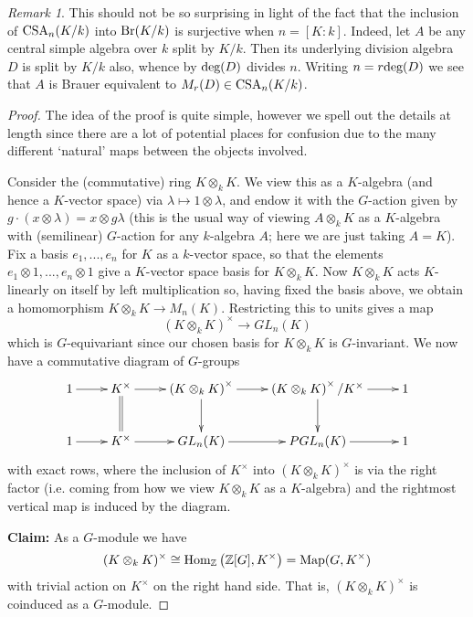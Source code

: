 \documentclass[11pt]{amsart}
\numberwithin{equation}{section}
\theoremstyle{remark}
\newtheorem{remark}[equation]{Remark}
\theoremstyle{remark}
\theoremstyle{remark}
\theoremstyle{definition}
\theoremstyle{definition}
\theoremstyle{definition}
\theoremstyle{definition}
\theoremstyle{definition}
\theoremstyle{definition}
\begin{document}
\begin{remark} \label{expected surjectivity remark}
This should not be so surprising in light of the fact that the inclusion of $\textup{CSA}_n(K/k)$ into $\textup{Br}(K/k)$ is surjective when $n=[K:k]$. Indeed, let $A$ be any central simple algebra over $k$ split by $K/k$. Then its underlying division algebra $D$ is split by $K/k$ also, whence by  $\textup{deg}(D)$ divides $n$. Writing $n=r \textup{deg}(D)$ we see that $A$ is Brauer equivalent to $M_r(D)\in \textup{CSA}_n(K/k)$.
\end{remark}

\begin{proof}
The idea of the proof is quite simple, however we spell out the details at length since there are a lot of potential places for confusion due to the many different `natural' maps between the objects involved. 

Consider the (commutative) ring $K\otimes_{k} K$. We view this as a $K$-algebra (and hence a $K$-vector space) via $\lambda \mapsto 1\otimes \lambda$, and endow it with the $G$-action given by $g\cdot (x\otimes \lambda)=x\otimes g\lambda$ (this is the usual way of viewing $A\otimes_k K$ as a $K$-algebra with (semilinear) $G$-action for any $k$-algebra $A$; here we are just taking $A=K$). Fix a basis $e_1,...,e_n$ for $K$ as a $k$-vector space, so that the elements $e_1\otimes 1,...,e_n\otimes 1$ give a $K$-vector space basis for $K\otimes_k K$. Now  $K\otimes_k K$ acts $K$-linearly on itself by left multiplication so, having fixed the basis above, we obtain a homomorphism $K\otimes_k K\rightarrow M_n(K)$. Restricting this to  units gives a map 
\[\left(K\otimes_{k}K\right)^{\times} \longrightarrow GL_n(K)\]
which is $G$-equivariant since our chosen basis for $K\otimes_k K$ is $G$-invariant. We now have a commutative diagram of $G$-groups
\begin{equation} \label{convoluted proof diagram}
\xymatrix{1 \ar[r]& K^{\times}\ar@{=}[d] \ar[r] &\left(K\otimes_{k}K\right)^{\times} \ar[r]\ar[d]& \left(K\otimes_{k}K\right)^{\times}/K^{\times}\ar[d]\ar[r]&1\\
1\ar[r]&K^{\times}\ar[r] & GL_n(K)\ar[r] & PGL_n(K)\ar[r]&1}
\end{equation}
with exact rows, where the inclusion of $K^\times$ into $(K\otimes_k K)^{\times}$ is via the right factor (i.e. coming from how we view $K\otimes_k K$ as a $K$-algebra) and the rightmost vertical map is induced by the diagram.  

\textbf{Claim:} As a $G$-module we have 
\[(K\otimes_k K)^{\times} \cong \textup{Hom}_{\mathbb{Z}}\left(\mathbb{Z}[G],K^\times\right)=\textup{Map}(G,K^\times)\]
with trivial action on $K^\times$ on the right hand side. That is,  $(K\otimes_k K)^{\times}$ is coinduced as a $G$-module.


\end{proof}
\end{document}
